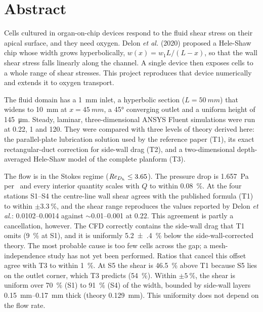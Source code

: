 \chapter*{Abstract}

Cells cultured in organ-on-chip devices respond to the fluid shear stress on their apical surface, and they need oxygen. Delon \emph{et al.} (2020) proposed a Hele-Shaw chip whose width grows hyperbolically, $w(x)=w_1L/(L-x)$, so that the wall shear stress falls linearly along the channel. A single device then exposes cells to a whole range of shear stresses. This project reproduces that device numerically and extends it to oxygen transport.

The fluid domain has a \SI{1}{mm} inlet, a hyperbolic section ($L=\SI{50}{mm}$) that widens to \SI{10}{mm} at $x=\SI{45}{mm}$, a \ang{45} converging outlet and a uniform height of \SI{145}{\micro\metre}. Steady, laminar, three-dimensional ANSYS Fluent simulations were run at 0.22, 1 and \SI{120}{\uLmin}. They were compared with three levels of theory derived here: the parallel-plate lubrication solution used by the reference paper (T1), its exact rectangular-duct correction for side-wall drag (T2), and a two-dimensional depth-averaged Hele-Shaw model of the complete planform (T3).

The flow is in the Stokes regime ($\mathit{Re}_{D_h}\le3.65$). The pressure drop is \SI{1.657}{Pa} per \ulmin\ and every interior quantity scales with $Q$ to within \SI{0.08}{\percent}. At the four stations S1--S4 the centre-line wall shear agrees with the published formula (T1) to within $\pm\SI{3.3}{\percent}$, and the shear range reproduces the values reported by Delon \emph{et al.}: \SIrange{0.0102}{0.0014}{\dyncm} against $\sim$\SIrange{0.01}{0.001}{\dyncm} at \SI{0.22}{\uLmin}. This agreement is partly a cancellation, however. The CFD correctly contains the side-wall drag that T1 omits (\SI{+9}{\percent} at S1), and it is uniformly \SI{5.2(4)}{\percent} below the side-wall-corrected theory. The most probable cause is too few cells across the gap; a mesh-independence study has not yet been performed. Ratios that cancel this offset agree with T3 to within \SI{1}{\percent}. At S5 the shear is \SI{46.5}{\percent} above T1 because S5 lies on the outlet corner, which T3 predicts (\SI{+54}{\percent}). Within $\pm\SI{5}{\percent}$, the shear is uniform over \SI{70}{\percent} (S1) to \SI{91}{\percent} (S4) of the width, bounded by side-wall layers \SIrange{0.15}{0.17}{mm} thick (theory \SI{0.129}{mm}). This uniformity does not depend on the flow rate.

